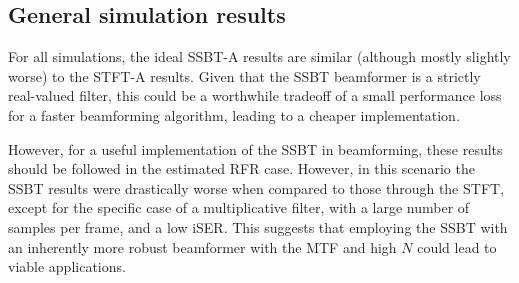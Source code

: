 
\subsection{General simulation results}

For all simulations, the ideal SSBT-A results are similar (although mostly slightly worse) to the STFT-A results. Given that the SSBT beamformer is a strictly real-valued filter, this could be a worthwhile tradeoff of a small performance loss for a faster beamforming algorithm, leading to a cheaper implementation.

However, for a useful implementation of the SSBT in beamforming, these results should be followed in the estimated RFR case. However, in this scenario the SSBT results were drastically worse when compared to those through the STFT, except for the specific case of a multiplicative filter, with a large number of samples per frame, and a low iSER. This suggests that employing the SSBT with an inherently more robust beamformer with the MTF and high $N$ could lead to viable applications.